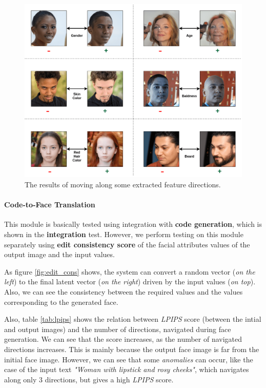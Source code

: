 \begin{figure}[H]
    \centering
    \includegraphics[width=\textwidth]{images/directions-results.png}
    \caption{The results of moving along some extracted feature directions.}
    \label{fig:dir_results}
\end{figure}

\paragraph{Code-to-Face Translation}
This module is basically tested using integration with \textbf{code generation}, which is shown in the \textbf{integration} test. However, we perform testing on this module separately using \textbf{edit consistency score} of the facial attributes values of the output image and the input values. 

As figure \ref{fig:edit_cons} shows, the system can convert a random vector (\emph{on the left}) to the final latent vector (\emph{on the right}) driven by the input values (\emph{on top}). Also, we can see the consistency between the required values and the values corresponding to the generated face.

Also, table \ref{tab:lpips} shows the relation between \emph{LPIPS} score (between the intial and output images) and the number of directions, navigated during face generation. We can see that the score increases, as the number of navigated directions increases. This is mainly because the output face image is far from the initial face image. However, we can see that some \emph{anomalies} can occur, like the case of the input text \emph{"Woman with lipstick and rosy cheeks"}, which navigates along only $3$ directions, but gives a high \emph{LPIPS} score.

